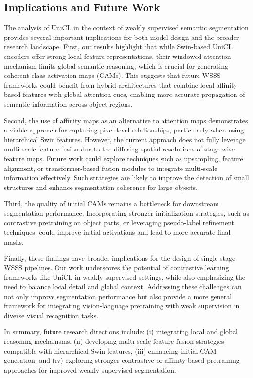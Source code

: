 
\subsection{Implications and Future Work}
\label{subsec:implications_and_future_work}
The analysis of UniCL in the context of weakly supervised semantic segmentation provides several important implications for both model design and the broader research landscape. First, our results highlight that while Swin-based UniCL encoders offer strong local feature representations, their windowed attention mechanism limits global semantic reasoning, which is crucial for generating coherent class activation maps (CAMs). This suggests that future WSSS frameworks could benefit from hybrid architectures that combine local affinity-based features with global attention cues, enabling more accurate propagation of semantic information across object regions.  

Second, the use of affinity maps as an alternative to attention maps demonstrates a viable approach for capturing pixel-level relationships, particularly when using hierarchical Swin features. However, the current approach does not fully leverage multi-scale feature fusion due to the differing spatial resolutions of stage-wise feature maps. Future work could explore techniques such as upsampling, feature alignment, or transformer-based fusion modules to integrate multi-scale information effectively. Such strategies are likely to improve the detection of small structures and enhance segmentation coherence for large objects.  

Third, the quality of initial CAMs remains a bottleneck for downstream segmentation performance. Incorporating stronger initialization strategies, such as contrastive pretraining on object parts, or leveraging pseudo-label refinement techniques, could improve initial activations and lead to more accurate final masks.  

Finally, these findings have broader implications for the design of single-stage WSSS pipelines. Our work underscores the potential of contrastive learning frameworks like UniCL in weakly supervised settings, while also emphasizing the need to balance local detail and global context. Addressing these challenges can not only improve segmentation performance but also provide a more general framework for integrating vision-language pretraining with weak supervision in diverse visual recognition tasks.  

In summary, future research directions include: (i) integrating local and global reasoning mechanisms, (ii) developing multi-scale feature fusion strategies compatible with hierarchical Swin features, (iii) enhancing initial CAM generation, and (iv) exploring stronger contrastive or affinity-based pretraining approaches for improved weakly supervised segmentation.
